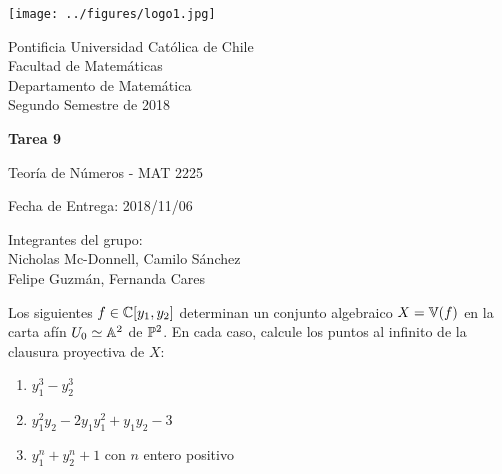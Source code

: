 


\begin{minipage}{2.5cm}
	\texttt{[image: ../figures/logo1.jpg]}
\end{minipage}
\begin{minipage}{13cm}
	\begin{flushleft}
		\raggedright
		{
			\noindent
			{\sc Pontificia Universidad Católica de Chile\\
				Facultad de Matemáticas\\
				Departamento de Matemática} \smallskip \\
			Segundo Semestre de 2018\\
		}
	\end{flushleft}
\end{minipage}

\vspace{2ex}
{\Large \centerline{\bf Tarea 9}}
{\large \centerline{Teoría de Números - MAT 2225}}
\centerline{Fecha de Entrega: 2018/11/06}

\begin{flushright}
	Integrantes del grupo:\\
	Nicholas Mc-Donnell, Camilo Sánchez\\
	Felipe Guzmán, Fernanda Cares
\end{flushright}

\begin{prob}[2 pts. c/u]
	Los siguientes $f\in\mathbb{C}[y_1,y_2]$ determinan un conjunto algebraico $X=\mathbb{V}(f)$ en la carta afín $U_0\simeq\mathbb{A}^2$ de $\mathbb{P}^2$. En cada caso, calcule los puntos al infinito de la clausura proyectiva de $X$:
	\begin{enumerate}
		\item $y_1^3-y_2^3$
		\item $y_1^2y_2-2y_1y_1^2+y_1y_2-3$
		\item $y_1^n+y_2^n+1$ con $n$ entero positivo
	\end{enumerate}
\end{prob}

